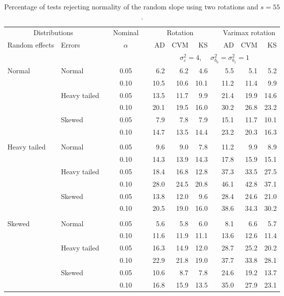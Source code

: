 \begin{table}[ht]
\centering
\caption{\label{tab:fixedsimb155} Percentage of tests rejecting normality of the random slope using two rotations and $s = 55$.}
\begin{scriptsize}
\begin{tabular}{ll p{.1cm} c p{.1cm} rrr p{.1cm} rrr}
  \hline
  \multicolumn{2}{c}{Distributions}& & Nominal & &  \multicolumn{3}{c}{Rotation} & & \multicolumn{3}{c}{Varimax rotation} \\ \cline{1-2} \cline{6-8} \cline{10-12}   
  Random effects & Errors & & $\alpha$ & & AD & CVM & KS & & AD & CVM & KS \\ 
   \hline
& && && \multicolumn{7}{c}{$\sigma_{\varepsilon}^2 = 4$, \ \ $\sigma_{b_0}^2 = \sigma_{b_1}^2 = 1$} \\ \cline{6-12}
\rowcolor{gray!20} Normal & Normal &  & 0.05 &  & 6.2 & 6.2 & 4.6 &  & 5.5 & 5.1 & 5.2 \\ 
\rowcolor{gray!20}    &  &  & 0.10 &  & 10.5 & 10.6 & 10.1 &  & 11.2 & 11.4 & 9.9 \\ 
\rowcolor{gray!20}    & Heavy tailed &  & 0.05 &  & 13.5 & 11.7 & 9.9 &  & 21.4 & 19.9 & 14.6 \\ 
\rowcolor{gray!20}    &  &  & 0.10 &  & 20.1 & 19.5 & 16.0 &  & 30.2 & 26.8 & 23.2 \\ 
\rowcolor{gray!20}    & Skewed &  & 0.05 &  & 7.9 & 7.8 & 7.9 &  & 15.1 & 11.7 & 10.1 \\ 
\rowcolor{gray!20}    &  &  & 0.10 &  & 14.7 & 13.5 & 14.4 &  & 23.2 & 20.3 & 16.3 \\ 
&&&&&&&&&&&\\
  Heavy tailed & Normal &  & 0.05 &  & 9.6 & 9.0 & 7.8 &  & 11.2 & 9.9 & 8.9 \\ 
   &  &  & 0.10 &  & 14.3 & 13.9 & 14.3 &  & 17.8 & 15.9 & 15.1 \\ 
   & Heavy tailed &  & 0.05 &  & 18.4 & 16.8 & 12.8 &  & 37.3 & 33.5 & 27.5 \\ 
   &  &  & 0.10 &  & 28.0 & 24.5 & 20.8 &  & 46.1 & 42.8 & 37.1 \\ 
   & Skewed &  & 0.05 &  & 13.8 & 12.0 & 9.6 &  & 28.4 & 24.6 & 21.0 \\ 
   &  &  & 0.10 &  & 20.5 & 19.0 & 16.0 &  & 38.6 & 34.3 & 30.2 \\ 
&&&&&&&&&&&\\
  Skewed & Normal &  & 0.05 &  & 5.6 & 5.8 & 6.0 &  & 8.1 & 6.6 & 5.7 \\ 
   &  &  & 0.10 &  & 11.6 & 11.9 & 11.1 &  & 13.6 & 12.6 & 11.4 \\ 
   & Heavy tailed &  & 0.05 &  & 16.3 & 14.9 & 12.0 &  & 28.7 & 25.2 & 20.2 \\ 
   &  &  & 0.10 &  & 22.9 & 21.8 & 19.0 &  & 37.7 & 33.8 & 28.1 \\ 
   & Skewed &  & 0.05 &  & 10.6 & 8.7 & 7.8 &  & 24.6 & 19.2 & 13.7 \\ 
   &  &  & 0.10 &  & 16.8 & 15.9 & 13.5 &  & 35.0 & 27.9 & 23.1 \\ 


\end{tabular}
\end{scriptsize}
\end{table}
